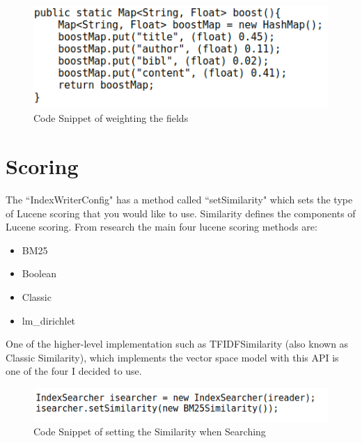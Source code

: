 	\begin{figure}[ht!]
		\begin{center}
			\includegraphics[scale=.4]{4} 
			\caption{Code Snippet of weighting the fields}
			\label{fig:1}
		\end{center}
	\end{figure} \par

\newpage
\section{Scoring}

The ``IndexWriterConfig" has a method called ``setSimilarity" which sets the type of Lucene scoring that you would like to use. Similarity defines the components of Lucene scoring. From research the main four lucene scoring methods are: \par
		
	\begin{multicols}{2}
		\begin{itemize}
			\item BM25
			\item Boolean
			\item Classic
			\item lm\_dirichlet
		\end{itemize}
	\end{multicols}
	
One of the higher-level implementation such as TFIDFSimilarity (also known as Classic Similarity), which implements the vector space model with this API is one of the four I decided to use. \par 

	\begin{figure}[ht!]
		\begin{center}
			\includegraphics[scale=.5 ]{5} 
			\caption{Code Snippet of setting the Similarity when Searching}
			\label{fig:1}
		\end{center}
	\end{figure} \par

